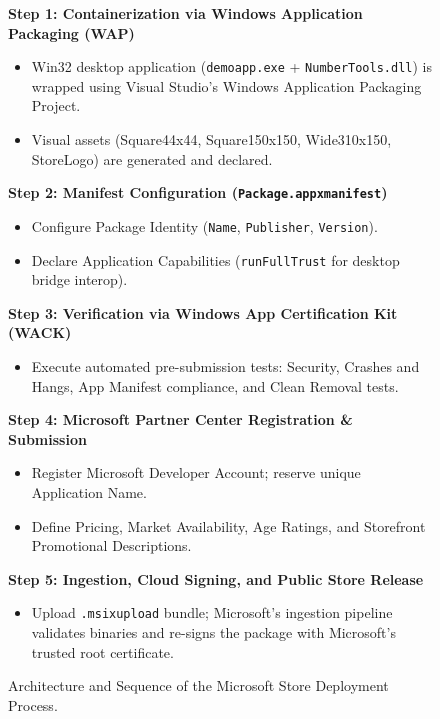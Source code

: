 \documentclass[11pt,a4paper]{article}
\begin{document}
\begin{figure}[H]
\centering
\begin{tcolorbox}[colback=codeBackground,colframe=navyBlue,title=\textbf{End-to-End Microsoft Store Publishing Pipeline}]
\small
\textbf{Step 1: Containerization via Windows Application Packaging (WAP)}
\begin{itemize}[leftmargin=0.5cm]
    \item Win32 desktop application (\texttt{demoapp.exe} + \texttt{NumberTools.dll}) is wrapped using Visual Studio's Windows Application Packaging Project.
    \item Visual assets (Square44x44, Square150x150, Wide310x150, StoreLogo) are generated and declared.
\end{itemize}
\textbf{Step 2: Manifest Configuration (\texttt{Package.appxmanifest})}
\begin{itemize}[leftmargin=0.5cm]
    \item Configure Package Identity (\texttt{Name}, \texttt{Publisher}, \texttt{Version}).
    \item Declare Application Capabilities (\texttt{runFullTrust} for desktop bridge interop).
\end{itemize}
\textbf{Step 3: Verification via Windows App Certification Kit (WACK)}
\begin{itemize}[leftmargin=0.5cm]
    \item Execute automated pre-submission tests: Security, Crashes and Hangs, App Manifest compliance, and Clean Removal tests.
\end{itemize}
\textbf{Step 4: Microsoft Partner Center Registration \& Submission}
\begin{itemize}[leftmargin=0.5cm]
    \item Register Microsoft Developer Account; reserve unique Application Name.
    \item Define Pricing, Market Availability, Age Ratings, and Storefront Promotional Descriptions.
\end{itemize}
\textbf{Step 5: Ingestion, Cloud Signing, and Public Store Release}
\begin{itemize}[leftmargin=0.5cm]
    \item Upload \texttt{.msixupload} bundle; Microsoft's ingestion pipeline validates binaries and re-signs the package with Microsoft's trusted root certificate.
\end{itemize}
\end{tcolorbox}
\caption{Architecture and Sequence of the Microsoft Store Deployment Process.}
\label{fig:store_pipeline}
\end{figure}
\end{document}
